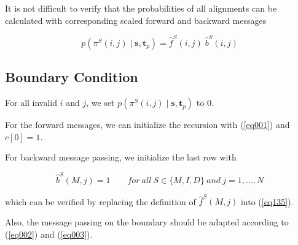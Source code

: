 \documentclass[10pt]{article}
\begin{document}
    It is not difficult to verify that the probabilities of all alignments can be calculated with corresponding scaled forward and backward messages

    \begin{equation} \label{eq135}
      p\left(\pi^S(i, j) \;|\; \mathbf{s}, \mathbf{t}_p\right) = \widehat{f}^{S}(i, j)\;\widehat{b}^{S}(i, j)
    \end{equation}

    \subsection{Boundary Condition}

    For all invalid $i$ and $j$, we set $p\left(\pi^S(i, j) \;|\; \mathbf{s}, \mathbf{t}_p\right)$ to 0.

    For the forward messages, we can initialize the recursion with (\ref{eq001}) and $c[0] = 1$.
    
    For backward message passing, we initialize the last row with

    \begin{equation}
      \widehat{b}^{S}(M, j) = 1 \qquad for\ all\ S \in \{M, I, D\}\ and\ j=1, \dots, N
    \end{equation}

    which can be verified by replacing the definition of $\widehat{f}^{S}(M, j)$ into (\ref{eq135}).

    Also, the message passing on the boundary should be adapted according to (\ref{eq002}) and (\ref{eq003}).
\end{document}
